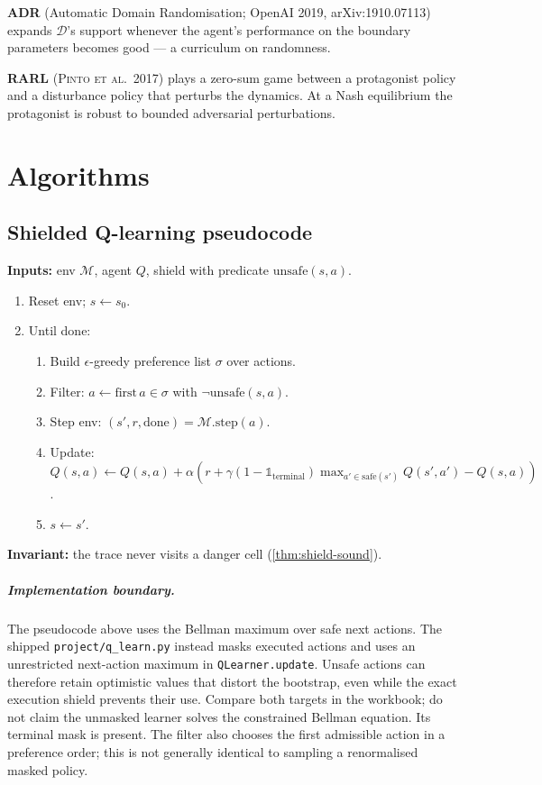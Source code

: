 \documentclass[11pt,oneside]{scrbook}
\begin{document}
\textbf{ADR} (Automatic Domain Randomisation; OpenAI 2019, arXiv:1910.07113)
expands $\mathcal{D}$'s support whenever the agent's performance on the
boundary parameters becomes good --- a curriculum on randomness.

\textbf{RARL} (\textsc{Pinto et al.\ 2017}) plays a zero-sum game between a
protagonist policy and a disturbance policy that perturbs the dynamics. At a
Nash equilibrium the protagonist is robust to bounded adversarial perturbations.

\chapter{Algorithms}

\section{Shielded Q-learning pseudocode}

\begin{tcolorbox}[colback=mintedbg, colframe=rlgray!50, title=\textbf{Algorithm: Shielded Q-learning (one episode)}]
\textbf{Inputs:} env $\mathcal{M}$, agent $Q$, shield with predicate
$\mathrm{unsafe}(s, a)$.
\begin{enumerate}[leftmargin=*]
  \item Reset env; $s \leftarrow s_0$.
  \item Until done:
  \begin{enumerate}
    \item Build $\epsilon$-greedy preference list $\sigma$ over actions.
    \item Filter: $a \leftarrow \text{first}\, a \in \sigma$ with $\neg\mathrm{unsafe}(s, a)$.
    \item Step env: $(s', r, \text{done}) = \mathcal{M}.\text{step}(a)$.
    \item Update: $Q(s, a) \leftarrow Q(s, a) + \alpha (r + \gamma(1-\mathbb{1}_{\mathrm{terminal}})\max_{a'\in\mathrm{safe}(s')} Q(s', a') - Q(s, a))$.
    \item $s \leftarrow s'$.
  \end{enumerate}
\end{enumerate}
\textbf{Invariant:} the trace never visits a danger cell (\cref{thm:shield-sound}).
\end{tcolorbox}

\paragraph{Implementation boundary.}
The pseudocode above uses the Bellman maximum over safe next actions.
The shipped \texttt{project/q\_learn.py} instead masks executed actions and
uses an unrestricted next-action maximum in \texttt{QLearner.update}.
Unsafe actions can therefore retain optimistic values that distort the
bootstrap, even while the exact execution shield prevents their use.
Compare both targets in the workbook; do not claim the unmasked learner
solves the constrained Bellman equation. Its terminal mask is present.
The filter also chooses the first admissible action in a preference order;
this is not generally identical to sampling a renormalised masked policy.
\end{document}
